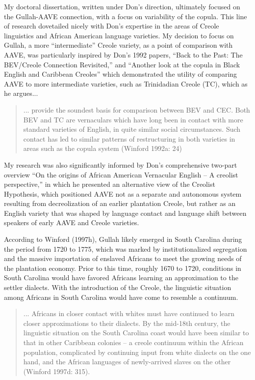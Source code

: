 \documentclass[output=paper, colorlinks,citecolor=brown]{langscibook}
\begin{document}
My doctoral dissertation, written under Don’s direction, ultimately focused on the Gullah-AAVE connection, with a focus on variability of the copula. This line of research dovetailed nicely with Don’s expertise in the areas of Creole linguistics and African American language varieties. My decision to focus on Gullah, a more “intermediate” Creole variety, as a point of comparison with AAVE, was particularly inspired by Don’s 1992 papers, “Back to the Past: The BEV/Creole Connection Revisited,” and “Another look at the copula in Black English and Caribbean Creoles” which demonstrated the utility of comparing AAVE to more intermediate varieties, such as Trinidadian Creole (TC), which as he argues...

\begin{quote}
... provide the soundest basis for comparison between BEV and CEC. Both BEV and TC are vernaculars which have long been in contact with more standard varieties of English, in quite similar social circumstances. Such contact has led to similar patterns of restructuring in both varieties in areas such as the copula system (Winford 1992a: 24) 
\end{quote}
My research was also significantly informed by Don’s comprehensive two-part overview “On the origins of African American Vernacular English – A creolist perspective,” in which he presented an alternative view of the Creolist Hypothesis, which positioned AAVE not as a separate and autonomous system resulting from decreolization of an earlier plantation Creole, but rather as an English variety that was shaped by language contact and language shift between speakers of early AAVE and Creole varieties. 

According to Winford (1997h), Gullah likely emerged in South Carolina during the period from 1720 to 1775, which was marked by institutionalized segregation and the massive importation of enslaved Africans to meet the growing needs of the plantation economy. Prior to this time, roughly 1670 to 1720, conditions in South Carolina would have favored Africans learning an approximation to the settler dialects. With the introduction of the Creole, the linguistic situation among Africans in South Carolina would have come to resemble a continuum. 


\begin{quote}
... Africans in closer contact with whites must have continued to learn closer approximations to their dialects. By the mid-18th century, the linguistic situation on the South Carolina coast would have been similar to that in other Caribbean colonies -- a creole continuum within the African population, complicated by continuing input from white dialects on the one hand, and the African languages of newly-arrived slaves on the other (Winford 1997d: 315). 
\end{quote}
\end{document}
